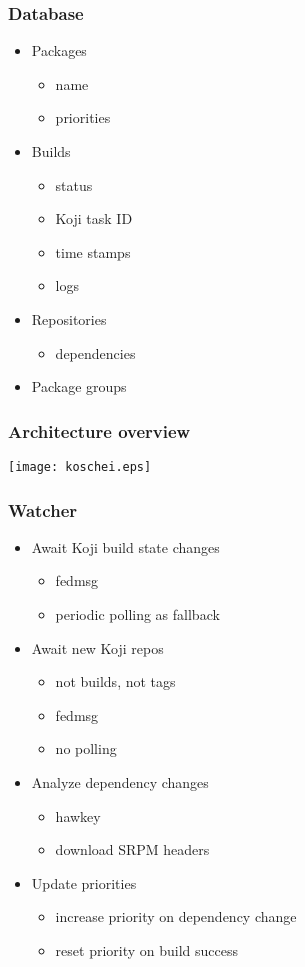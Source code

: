\documentclass[pdftex,unicode,xcolor=table]{beamer}
\begin{document}
\begin{frame}
  \frametitle{Database}
  \begin{itemize}
    \item Packages
    \begin{itemize}
      \item name
      \item priorities
    \end{itemize}
    \item Builds
    \begin{itemize}
      \item status
      \item Koji task ID
      \item time stamps
      \item logs
    \end{itemize}
    \item Repositories
    \begin{itemize}
      \item dependencies
    \end{itemize}
    \item Package groups
  \end{itemize}
\end{frame}

\begin{frame}[fragile]
  \frametitle{Architecture overview}
  \begin{center}
    \texttt{[image: koschei.eps]}
  \end{center}
\end{frame}

\begin{frame}
  \frametitle{Watcher}
  \begin{itemize}
    \item Await Koji build state changes
    \begin{itemize}
      \item fedmsg
      \item periodic polling as fallback
    \end{itemize}
    \item Await new Koji repos
    \begin{itemize}
      \item not builds, not tags
      \item fedmsg
      \item no polling
    \end{itemize}
    \item Analyze dependency changes
    \begin{itemize}
      \item hawkey
      \item download SRPM headers
    \end{itemize}
    \item Update priorities
    \begin{itemize}
      \item increase priority on dependency change
      \item reset priority on build success
    \end{itemize}
  \end{itemize}
\end{frame}
\end{document}
